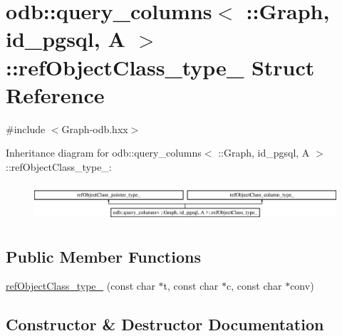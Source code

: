 \hypertarget{structodb_1_1query__columns_3_01_1_1_graph_00_01id__pgsql_00_01_a_01_4_1_1ref_object_class__type__}{}\section{odb\+:\+:query\+\_\+columns$<$ \+:\+:Graph, id\+\_\+pgsql, A $>$\+:\+:ref\+Object\+Class\+\_\+type\+\_\+ Struct Reference}
\label{structodb_1_1query__columns_3_01_1_1_graph_00_01id__pgsql_00_01_a_01_4_1_1ref_object_class__type__}


{\ttfamily \#include $<$Graph-\/odb.\+hxx$>$}

Inheritance diagram for odb\+:\+:query\+\_\+columns$<$ \+:\+:Graph, id\+\_\+pgsql, A $>$\+:\+:ref\+Object\+Class\+\_\+type\+\_\+\+:\begin{figure}[H]
\begin{center}
\leavevmode
\includegraphics[height=1.407035cm]{d1/df4/structodb_1_1query__columns_3_01_1_1_graph_00_01id__pgsql_00_01_a_01_4_1_1ref_object_class__type__}
\end{center}
\end{figure}
\subsection*{Public Member Functions}
\begin{DoxyCompactItemize}
\item 
\hyperlink{structodb_1_1query__columns_3_01_1_1_graph_00_01id__pgsql_00_01_a_01_4_1_1ref_object_class__type___a90db749d4fd07ff285865a297cd8d239}{ref\+Object\+Class\+\_\+type\+\_\+} (const char $\ast$t, const char $\ast$c, const char $\ast$conv)
\end{DoxyCompactItemize}


\subsection{Constructor \& Destructor Documentation}
\hypertarget{structodb_1_1query__columns_3_01_1_1_graph_00_01id__pgsql_00_01_a_01_4_1_1ref_object_class__type___a90db749d4fd07ff285865a297cd8d239}{}
